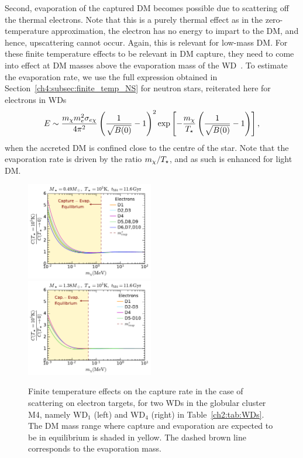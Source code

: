 Second, evaporation of the captured DM becomes possible due to scattering off the thermal electrons. Note that this is a purely thermal effect as in the zero-temperature approximation, the electron has no energy to impart to the DM, and hence, upscattering cannot occur.  Again, this is relevant for low-mass DM. 
For these finite temperature effects to be relevant in DM capture, they need to come into effect at DM masses above the evaporation mass of the WD~\cite{Garani:2018kkd_may_NewAnalysisNeutron, Bell:2020lmm_mar_ImprovedTreatmentDark}. 
To estimate the evaporation rate, we use  the full expression  obtained in Section~\ref{ch4:subsec:finite_temp_NS} for neutron stars, reiterated here for electrons in WDs
\begin{equation}
E \sim  \frac{ m_\chi m_e^2\sigma_{e\chi}}{4\pi^2} \left(\frac{1}{\sqrt{B(0)}}-1\right)^2  \exp\left[{-\frac{m_\chi}{T_\star}}\left(\frac{1}{\sqrt{B(0)}}-1\right)\right],  
\label{ch4:eq:evap_WD}
\end{equation}
when the accreted DM is confined close to the centre of the star. 
Note that the evaporation rate is driven by the ratio $m_\chi/T_\star$, and as such is enhanced for light DM. 

\begin{figure}[t!bp]
    \centering
  \includegraphics[width=0.495\textwidth]{wd_capture/R_CT_mdm_10_5K_D1_D10_e_M4S_0.49Msun.pdf}
  \includegraphics[width=0.495\textwidth]{wd_capture/R_CT_mdm_10_5K_D1_D10_e_M4S_1.38Msun.pdf} 
    \caption[Finite temperature effects on the capture rate in the case of scattering on electron targets, for two WDs in the globular cluster M4, namely WD$_1$ (left) and WD$_4$ (right) in Table~\ref{ch2:tab:WDs}.]{Finite temperature effects on the capture rate in the case of scattering on electron targets, for two WDs in the globular cluster M4, namely WD$_1$ (left) and WD$_4$ (right) in Table~\ref{ch2:tab:WDs}. The DM mass range where capture and evaporation are expected to be in equilibrium is shaded in yellow. The dashed brown line corresponds to the evaporation mass.}
    \label{ch4:fig:capTfinelec}
\end{figure}


